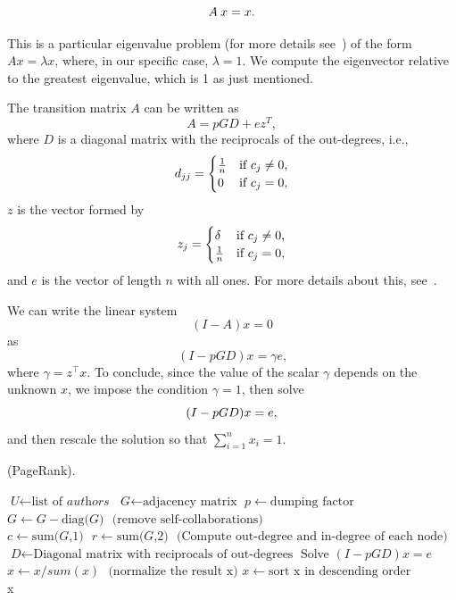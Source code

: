 \documentclass[]{usiinfbachelorproject}
\newcommand\transp[1]{{#1}^{\top}}
\begin{document}
\begin{equation}\notag
A\:x = x \text{.}
\end{equation}

This is a particular eigenvalue problem (for more details see~\cite[Chapter 8]{eigs}) of the form $Ax=\lambda x$, where, in our specific case, $\lambda = 1$. We compute the eigenvector relative to the greatest eigenvalue, which is 1 as just mentioned.

The transition matrix $A$ can be written as
$$A = pGD+ez^{T}, $$
where $D$ is a diagonal matrix with the reciprocals of the out-degrees, i.e.,
\begin{equation}\notag
d_{jj} = 
\begin{cases}
\frac{1}{n} & \text{if } c_{j} \neq 0 \text{,}\\
0 & \text{if } c_{j} = 0 \text{,}
\end{cases} 
\end{equation}
$z$ is the vector formed by
\begin{equation}\notag
z_{j} = 
\begin{cases}
\delta & \text{if } c_{j} \neq 0 \text{,}\\
\frac{1}{n} & \text{if } c_{j} = 0 \text{,}
\end{cases} 
\end{equation}
and $e$ is the vector of length $n$ with all ones. For more details about this, see~\cite[Chapter 7]{molerPR}.

We can write the linear system
$$(I-A)x=0$$
as
$$(I - pGD)x = \gamma e \text{,}$$
where $\gamma = \transp{z}x$.
To conclude, since the value of the scalar $\gamma$ depends on the unknown $x$, we impose the condition $\gamma = 1$, then solve
\begin{equation}\notag
(I - pGD)x = e \text{,}
\end{equation}
and then rescale the solution so that $\sum\limits_{i=1}^{n} x_i = 1$.

\begin{algorithm}
\caption{ (PageRank).}\label{pagerank}
\begin{algorithmic}[1]
\State $\textit{U} \gets \text{list of }\textit{authors}$
\State $\textit{G} \gets \text{adjacency matrix}$
\State $p \gets \text{dumping factor}$
\State $\textit{G} \gets \textit{G} - \text{diag(}\textit{G}\text{)} \: \: \: \text{(remove self-collaborations)}$
\State $\textit{c} \gets \text{sum(}\textit{G}\text{,1)} \:\:\: \textit{r} \gets \text{sum(}\textit{G}\text{,2)} \:\:\: \text{(Compute out-degree and in-degree of each node)}$
\State $\textit{D} \gets \text{Diagonal matrix with reciprocals of out-degrees}$
\State Solve $(I - pGD)x = e$
\State $x \gets x / sum(x) \: \:\: \text{(normalize the result x)}$
\State $x \gets \text{sort x in descending order}$\\
\Return x
\EndProcedure
\end{algorithmic}
\end{algorithm}
\end{document}
